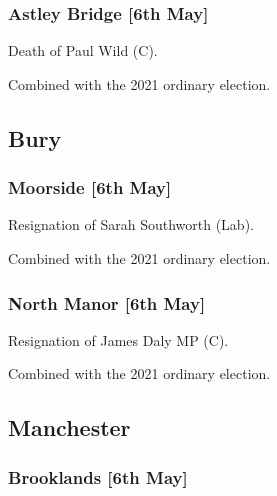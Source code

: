 \documentclass[a4paper,openany]{book}
\begin{document}
\begin{resultsiii}
\subsubsection*{Astley Bridge \hspace*{\fill}\nolinebreak[1]%
	\enspace\hspace*{\fill}
	[6th May]}


Death of Paul Wild (C).

Combined with the 2021 ordinary election.

\subsection*{Bury}

\subsubsection*{Moorside \hspace*{\fill}\nolinebreak[1]%
	\enspace\hspace*{\fill}
	[6th May]}


Resignation of Sarah Southworth (Lab).

Combined with the 2021 ordinary election.

\subsubsection*{North Manor \hspace*{\fill}\nolinebreak[1]%
	\enspace\hspace*{\fill}
	[6th May]}


Resignation of James Daly MP (C).

Combined with the 2021 ordinary election.

\subsection*{Manchester}

\subsubsection*{Brooklands \hspace*{\fill}\nolinebreak[1]%
	\enspace\hspace*{\fill}
	[6th May]}


\end{resultsiii}
\end{document}
